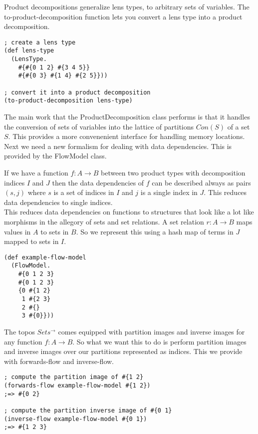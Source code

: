 \documentclass[a4paper,11pt]{report}
\begin{document}
Product decompositions generalize lens types, to arbitrary sets of variables. The to-product-decomposition function lets you convert a lens type into a product decomposition.

\lstset {language=Lisp}
\begin{lstlisting}
; create a lens type
(def lens-type 
  (LensType.
    #{#{0 1 2} #{3 4 5}}
    #{#{0 3} #{1 4} #{2 5}}))
    
; convert it into a product decomposition
(to-product-decomposition lens-type)
\end{lstlisting}

The main work that the ProductDecomposition class performs is that it handles the conversion of sets of variables into the lattice of partitions $Con(S)$ of a set $S$. This provides a more convenenient interface for handling memory locations. Next we need a new formalism for dealing with data dependencies. This is provided by the FlowModel class.

\newpage 

If we have a function $f : A \to B$ between two product types with decomposition indices $I$ and $J$ then the data dependencies of $f$ can be described always as pairs $(s,j)$ where $s$ is a set of indices in $I$ and $j$ is a single index in $J$. This reduces data dependencies to single indices. \\

This reduces data dependencies on functions to structures that look like a lot like morphisms in the allegory of sets and set relations. A set relation $r : A \to B$ maps values in $A$ to sets in $B$. So we represent this using a hash map of terms in $J$ mapped to sets in $I$. 

\lstset {language=Lisp}
\begin{lstlisting}
(def example-flow-model
  (FlowModel.
    #{0 1 2 3}
    #{0 1 2 3}
    {0 #{1 2}
     1 #{2 3}
     2 #{}
     3 #{0}}))
\end{lstlisting}

The topos $Sets^{\to}$ comes equipped with partition images and inverse images for any function $f : A \to B$. So what we want this to do is perform partition images and inverse images over our partitions represented as indices. This we provide with forwards-flow and inverse-flow.

\lstset {language=Lisp}
\begin{lstlisting}
; compute the partition image of #{1 2}
(forwards-flow example-flow-model #{1 2})
;=> #{0 2}

; compute the partition inverse image of #{0 1}
(inverse-flow example-flow-model #{0 1})
;=> #{1 2 3}
\end{lstlisting}
\end{document}
